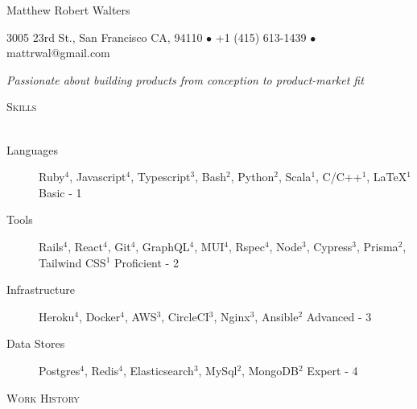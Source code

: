 \documentclass{article}
\newcommand{\lineunder}{\vspace*{-8pt} \\ \hspace*{-18pt} \hrulefill \\}
\newcommand{\header}[1]{{\hspace*{-15pt}\vspace*{6pt} \textsc{#1}} \vspace*{-6pt} \lineunder}
\begin{document}
\small
\smallskip
\vspace*{-44pt}


\begin{center}
 
\huge Matthew Robert Walters 
\linebreak
\normalsize

{3005 23rd St., San Francisco CA, 94110 $\bullet$ +1 (415) 613-1439 $\bullet$ mattrwal@gmail.com} \newline

 \textit{Passionate about building products from conception to product-market fit}
\end{center}

\small

\header{Skills}

\begin{description}

\item[Languages] Ruby$^4$, Javascript$^4$, Typescript$^3$, Bash$^2$, Python$^2$, Scala$^1$, C/C++$^1$, \LaTeX$^1$              \hfill Basic - 1

\item[Tools] Rails$^4$, React$^4$, Git$^4$, GraphQL$^4$, MUI$^4$, Rspec$^4$, Node$^3$, Cypress$^3$, Prisma$^2$, Tailwind CSS$^1$     \hfill Proficient - 2	
\item[Infrastructure] Heroku$^4$, Docker$^4$, AWS$^3$, CircleCI$^3$, Nginx$^3$, Ansible$^2$                  \hfill Advanced - 3

			                                            
\item[Data Stores] Postgres$^4$, Redis$^4$, Elasticsearch$^3$, MySql$^2$, MongoDB$^2$                  \hfill Expert - 4                                  

\end{description}

\header{Work History}
\end{document}
